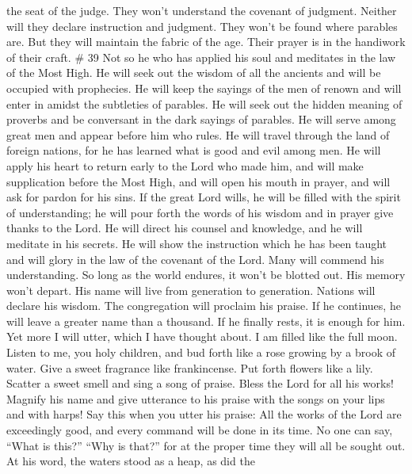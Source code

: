 the seat of the judge. They won't understand the covenant of judgment.
Neither will they declare instruction and judgment. They won't be found
where parables are.  But they will maintain the fabric of
the age. Their prayer is in the handiwork of their craft. \# 39
 Not so he who has applied his soul and meditates in the
law of the Most High. He will seek out the wisdom of all the ancients
and will be occupied with prophecies.  He will keep the
sayings of the men of renown and will enter in amidst the subtleties of
parables.  He will seek out the hidden meaning of proverbs
and be conversant in the dark sayings of parables.  He
will serve among great men and appear before him who rules. He will
travel through the land of foreign nations, for he has learned what is
good and evil among men.  He will apply his heart to
return early to the Lord who made him, and will make supplication before
the Most High, and will open his mouth in prayer, and will ask for
pardon for his sins.  If the great Lord wills, he will be
filled with the spirit of understanding; he will pour forth the words of
his wisdom and in prayer give thanks to the Lord.  He will
direct his counsel and knowledge, and he will meditate in his secrets.
 He will show the instruction which he has been taught and
will glory in the law of the covenant of the Lord.  Many
will commend his understanding. So long as the world endures, it won't
be blotted out. His memory won't depart. His name will live from
generation to generation.  Nations will declare his
wisdom. The congregation will proclaim his praise.  If he
continues, he will leave a greater name than a thousand. If he finally
rests, it is enough for him.  Yet more I will utter,
which I have thought about. I am filled like the full moon.
 Listen to me, you holy children, and bud forth like a
rose growing by a brook of water.  Give a sweet fragrance
like frankincense. Put forth flowers like a lily. Scatter a sweet smell
and sing a song of praise. Bless the Lord for all his works!
 Magnify his name and give utterance to his praise with
the songs on your lips and with harps! Say this when you utter his
praise:  All the works of the Lord are exceedingly good,
and every command will be done in its time.  No one can
say, ``What is this?'' ``Why is that?'' for at the proper time they will
all be sought out. At his word, the waters stood as a heap, as did the
